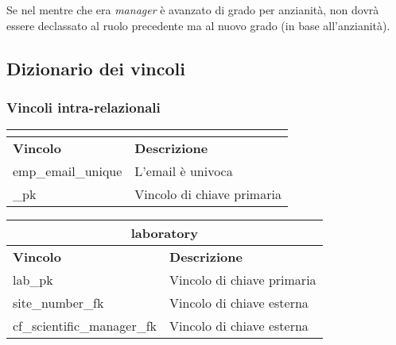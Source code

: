 Se nel mentre che era \textit{manager} è avanzato di grado per anzianità, non dovrà essere declassato al ruolo precedente ma al nuovo grado (in base all'anzianità).


\subsection{Dizionario dei vincoli}
\subsubsection{Vincoli intra-relazionali}
\begin{tabular}{@{}| p{} | p{} |@{}} %
	\hline
	\multicolumn{2}{|c|}{\textbf{\baseemp}}         \\
	\hline
	\textbf{Vincolo}   & \textbf{Descrizione}       \\
	\hline
	emp\_email\_unique & L'email è univoca          \\
	\hline

	\baseemp\_pk       & Vincolo di chiave primaria \\
	\hline
\end{tabular}\bskip
\begin{tabular}{@{}| p{} | p{} |@{}} %
	\hline
	\multicolumn{2}{|c|}{\textbf{laboratory}}                \\
	\hline
	\textbf{Vincolo}            & \textbf{Descrizione}       \\
	\hline
	lab\_pk                     & Vincolo di chiave primaria \\
	\hline
	site\_number\_fk            & Vincolo di chiave esterna  \\
	\hline
	cf\_scientific\_manager\_fk & Vincolo di chiave esterna  \\
	\hline
\end{tabular}\bskip
